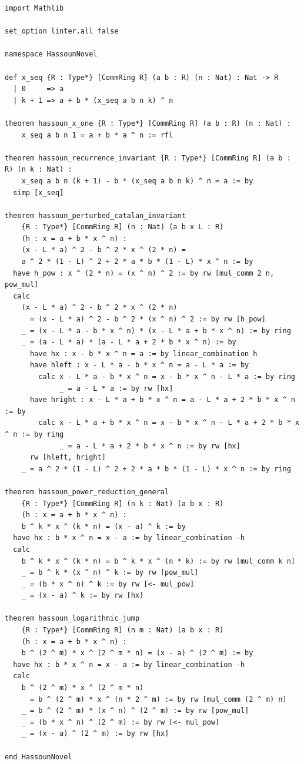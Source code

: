 \documentclass[11pt,a4paper]{article}
\theoremstyle{definition}
\begin{document}
\begin{lstlisting}[caption={Lean 4 Formalization of the Hassoun Novel System}]
import Mathlib

set_option linter.all false

namespace HassounNovel

def x_seq {R : Type*} [CommRing R] (a b : R) (n : Nat) : Nat -> R
  | 0     => a
  | k + 1 => a + b * (x_seq a b n k) ^ n

theorem hassoun_x_one {R : Type*} [CommRing R] (a b : R) (n : Nat) :
    x_seq a b n 1 = a + b * a ^ n := rfl

theorem hassoun_recurrence_invariant {R : Type*} [CommRing R] (a b : R) (n k : Nat) :
    x_seq a b n (k + 1) - b * (x_seq a b n k) ^ n = a := by
  simp [x_seq]

theorem hassoun_perturbed_catalan_invariant
    {R : Type*} [CommRing R] (n : Nat) (a b x L : R)
    (h : x = a + b * x ^ n) :
    (x - L * a) ^ 2 - b ^ 2 * x ^ (2 * n) =
    a ^ 2 * (1 - L) ^ 2 + 2 * a * b * (1 - L) * x ^ n := by
  have h_pow : x ^ (2 * n) = (x ^ n) ^ 2 := by rw [mul_comm 2 n, pow_mul]
  calc
    (x - L * a) ^ 2 - b ^ 2 * x ^ (2 * n)
      = (x - L * a) ^ 2 - b ^ 2 * (x ^ n) ^ 2 := by rw [h_pow]
    _ = (x - L * a - b * x ^ n) * (x - L * a + b * x ^ n) := by ring
    _ = (a - L * a) * (a - L * a + 2 * b * x ^ n) := by
      have hx : x - b * x ^ n = a := by linear_combination h
      have hleft : x - L * a - b * x ^ n = a - L * a := by
        calc x - L * a - b * x ^ n = x - b * x ^ n - L * a := by ring
             _ = a - L * a := by rw [hx]
      have hright : x - L * a + b * x ^ n = a - L * a + 2 * b * x ^ n := by
        calc x - L * a + b * x ^ n = x - b * x ^ n - L * a + 2 * b * x ^ n := by ring
             _ = a - L * a + 2 * b * x ^ n := by rw [hx]
      rw [hleft, hright]
    _ = a ^ 2 * (1 - L) ^ 2 + 2 * a * b * (1 - L) * x ^ n := by ring

theorem hassoun_power_reduction_general
    {R : Type*} [CommRing R] (n k : Nat) (a b x : R)
    (h : x = a + b * x ^ n) :
    b ^ k * x ^ (k * n) = (x - a) ^ k := by
  have hx : b * x ^ n = x - a := by linear_combination -h
  calc
    b ^ k * x ^ (k * n) = b ^ k * x ^ (n * k) := by rw [mul_comm k n]
    _ = b ^ k * (x ^ n) ^ k := by rw [pow_mul]
    _ = (b * x ^ n) ^ k := by rw [<- mul_pow]
    _ = (x - a) ^ k := by rw [hx]

theorem hassoun_logarithmic_jump
    {R : Type*} [CommRing R] (n m : Nat) (a b x : R)
    (h : x = a + b * x ^ n) :
    b ^ (2 ^ m) * x ^ (2 ^ m * n) = (x - a) ^ (2 ^ m) := by
  have hx : b * x ^ n = x - a := by linear_combination -h
  calc
    b ^ (2 ^ m) * x ^ (2 ^ m * n)
      = b ^ (2 ^ m) * x ^ (n * 2 ^ m) := by rw [mul_comm (2 ^ m) n]
    _ = b ^ (2 ^ m) * (x ^ n) ^ (2 ^ m) := by rw [pow_mul]
    _ = (b * x ^ n) ^ (2 ^ m) := by rw [<- mul_pow]
    _ = (x - a) ^ (2 ^ m) := by rw [hx]

end HassounNovel
\end{lstlisting}
\end{document}
